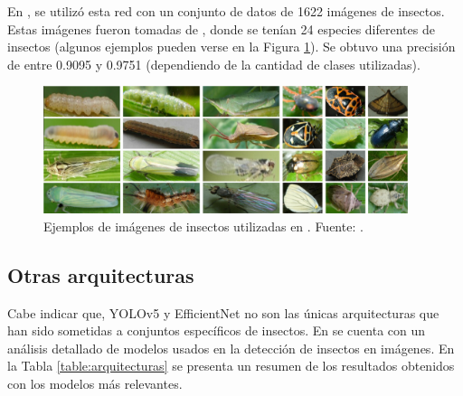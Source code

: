 En \cite{bjerge-2023}, se utilizó esta red con un conjunto de datos de 1622 imágenes de insectos. Estas imágenes fueron tomadas de \cite{XIE2015123}, donde se tenían 24 especies diferentes de insectos (algunos ejemplos pueden verse en la Figura \ref{fig:efficientnet-insects}). Se obtuvo una precisión de entre 0.9095 y 0.9751 (dependiendo de la cantidad de clases utilizadas).

\begin{figure}[ht]
    \centering
    \includegraphics[width=0.95\textwidth]{Figuras/efficientnet-insects.png}
    \caption[Ejemplos de imágenes de insectos utilizadas en {[20]}.]{Ejemplos de imágenes de insectos utilizadas en \cite{bjerge-2023}. Fuente: \cite{bjerge-2023}.}
    \label{fig:efficientnet-insects}
\end{figure}

\subsection{Otras arquitecturas}

Cabe indicar que, YOLOv5 y EfficientNet no son las únicas arquitecturas que han sido sometidas a conjuntos específicos de insectos. En \cite{li-2021} se cuenta con un análisis detallado de modelos usados en la detección de insectos en imágenes. En la Tabla \ref{table:arquitecturas} se presenta un resumen de los resultados obtenidos con los modelos más relevantes.

